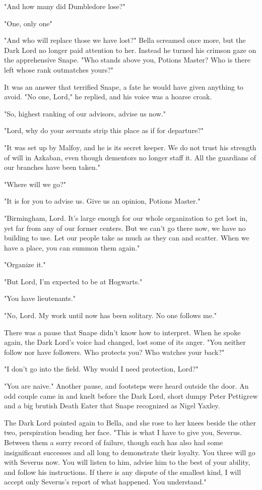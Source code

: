 "And how many did Dumbledore lose?"

"One, only one{\el}"

"And who will replace those we have lost?" Bella screamed once more, but the Dark Lord no longer paid attention to her. Instead he turned his crimson gaze on the apprehensive Snape. "Who stands above you, Potions Master? Who is there left whose rank outmatches yours?"

It was an answer that terrified Snape, a fate he would have given anything to avoid. "No one, Lord," he replied, and his voice was a hoarse croak.

"So, highest ranking of our advisors, advise us now."

"Lord, why do your servants strip this place as if for departure?"

"It was set up by Malfoy, and he is its secret keeper. We do not trust his strength of will in Azkaban, even though dementors no longer staff it. All the guardians of our branches have been taken."

"Where will we go?"

"It is for you to advise us. Give us an opinion, Potions Master."

"Birmingham, Lord. It's large enough for our whole organization to get lost in, yet far from any of our former centers. But we can't go there now, we have no building to use. Let our people take as much as they can and scatter. When we have a place, you can summon them again."

"Organize it."

"But Lord, I'm expected to be at Hogwarts."

"You have lieutenants."

"No, Lord. My work until now has been solitary. No one follows me."

There was a pause that Snape didn't know how to interpret. When he spoke again, the Dark Lord's voice had changed, lost some of its anger. "You neither follow nor have followers. Who protects you? Who watches your back?"

"I don't go into the field. Why would I need protection, Lord?"

"You are naive." Another pause, and footsteps were heard outside the door. An odd couple came in and knelt before the Dark Lord, short dumpy Peter Pettigrew and a big brutish Death Eater that Snape recognized as Nigel Yaxley.

The Dark Lord pointed again to Bella, and she rose to her knees beside the other two, perspiration beading her face. "This is what I have to give you, Severus. Between them a sorry record of failure, though each has also had some insignificant successes and all long to demonstrate their loyalty. You three will go with Severus now. You will listen to him, advise him to the best of your ability, and follow his instructions. If there is any dispute of the smallest kind, I will accept only Severus's report of what happened. You understand."

